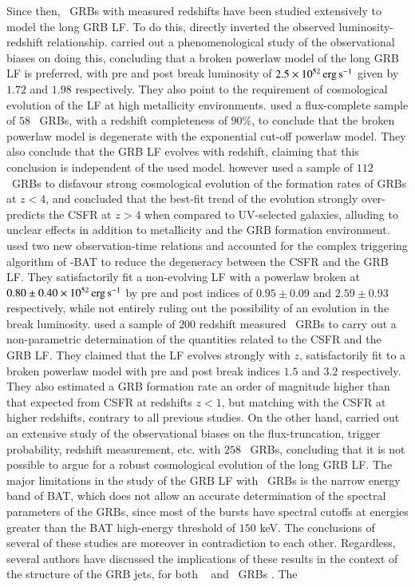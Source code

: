 Since then, \s\ GRBs with measured redshifts have been studied extensively to model the long GRB LF. To do this, \cite{Wanderman_&_Piran-2010-MNRAS} directly inverted the observed luminosity-redshift relationship. \cite{Cao_et_al.-2011-MNRAS} carried out a phenomenological study of the observational biases on doing this, concluding that a broken powerlaw model of the long GRB LF is preferred, with pre and post break luminosity of $2.5 \times 10^{52} \, \rm erg \, s^{-1} $ given by $1.72$ and $1.98$ respectively. They also point to the requirement of cosmological evolution of the LF at high metallicity environments. \cite{Salvaterra_et_al.-2012-ApJ} used a flux-complete sample of $58$ \s\ GRBs, with a redshift completeness of $90 \%$, to conclude that the broken powerlaw model is degenerate with the exponential cut-off powerlaw model. They also conclude that the GRB LF evolves with redshift, claiming that this conclusion is independent of the used model. \cite{Robertson_and_Ellis-2012-ApJ} however used a sample of $112$ \s\ GRBs to disfavour strong cosmological evolution of the formation rates of GRBs at $z<4$, and concluded that the best-fit trend of the evolution strongly over-predicts the CSFR at $z > 4$ when compared to UV-selected galaxies, alluding to unclear effects in addition to metallicity and the GRB formation environment. \cite{Howell_et_al.-2014-MNRAS} used two new observation-time relations and accounted for the complex triggering algorithm of \s-BAT to reduce the degeneracy between the CSFR and the GRB LF. They satisfactorily fit a non-evolving LF with a powerlaw broken at $0.80 \pm 0.40 \times 10^{52} \, \rm erg \, s^{-1}$ by pre and post indices of $0.95 \pm 0.09$ and $2.59 \pm 0.93$ respectively, while not entirely ruling out the possibility of an evolution in the break luminosity. \cite{Petrosian_et_al.-2015-ApJ} used a sample of $200$ redshift measured \s\ GRBs to carry out a non-parametric determination of the quantities related to the CSFR and the GRB LF. They claimed that the LF evolves strongly with $z$, satisfactorily fit to a broken powerlaw model with pre and post break indices $1.5$ and $3.2$ respectively. They also estimated a GRB formation rate an order of magnitude higher than that expected from CSFR at redshifts $z<1$, but matching with the CSFR at higher redshifts, contrary to all previous studies. On the other hand, \cite{Deng_et_al.-2016-ApJ} carried out an extensive study of the observational biases on the flux-truncation, trigger probability, redshift measurement, etc. with $258$ \s\ GRBs, concluding that it is not possible to argue for a robust cosmological evolution of the long GRB LF. The major limitations in the study of the GRB LF with \s\ GRBs is the narrow energy band of BAT, which does not allow an accurate determination of the spectral parameters of the GRBs, since most of the bursts have spectral cutoffs at energies greater than the BAT high-energy threshold of $150$ keV. The conclusions of several of these studies are moreover in contradiction to each other. Regardless, several authors have discussed the implications of these results in the context of the structure of the GRB jets, for both \B\ \citep{Firmani_et_al.-2004-ApJ,Guetta_Granot_Begelman-2005-ApJ,Guetta_Piran_Waxman-2005-ApJ} and \s\ GRBs \citep{Pescalli_et_al.-2015-MNRAS}. The 